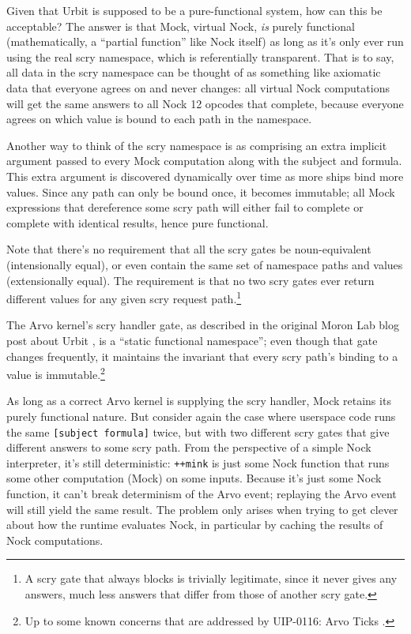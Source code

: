 \documentclass[twoside]{article}
\begin{document}
Given that Urbit is supposed to be a pure-functional system, how can this be acceptable?  The answer is that Mock, virtual Nock, \emph{is} purely functional (mathematically, a ``partial function'' like Nock itself) as long as it's only ever run using the real scry namespace, which is referentially transparent.  That is to say, all data in the scry namespace can be thought of as something like axiomatic data that everyone agrees on and never changes:  all virtual Nock computations will get the same answers to all Nock 12 opcodes that complete, because everyone agrees on which value is bound to each path in the namespace.

Another way to think of the scry namespace is as comprising an extra implicit argument passed to every Mock computation along with the subject and formula.  This extra argument is discovered dynamically over time as more ships bind more values.  Since any path can only be bound once, it becomes immutable; all Mock expressions that dereference some scry path will either fail to complete or complete with identical results, hence pure functional.

Note that there's no requirement that all the scry gates be noun-equivalent (intensionally equal), or even contain the same set of namespace paths and values (extensionally equal). The requirement is that no two scry gates ever return different values for any given scry request path.\footnote{A scry gate that always blocks is trivially legitimate, since it never gives any answers, much less answers that differ from those of another scry gate.}

\sloppy
The Arvo kernel's scry handler gate, as described in the original Moron Lab blog post about Urbit \citep{Yarvin2010}, is a ``static functional namespace''; even though that gate changes frequently, it maintains the invariant that every scry path's binding to a value is immutable.\footnote{Up to some known concerns that are addressed by UIP-0116: Arvo Ticks .}

As long as a correct Arvo kernel is supplying the scry handler, Mock retains its purely functional nature.  But consider again the case where userspace code runs the same \lstinline[style=inlinecode]{[subject formula]} twice, but with two different scry gates that give different answers to some scry path. From the perspective of a simple Nock interpreter, it's still deterministic:  \lstinline[style=inlinecode]{++mink} is just some Nock function that runs some other computation (Mock) on some inputs.  Because it's just some Nock function, it can't break determinism of the Arvo event; replaying the Arvo event will still yield the same result.  The problem only arises when trying to get clever about how the runtime evaluates Nock, in particular by caching the results of Nock computations.
\end{document}
